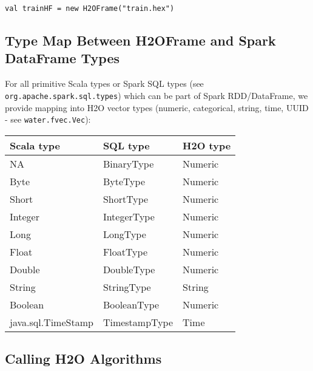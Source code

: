 \begin{lstlisting}[style=Scala]
val trainHF = new H2OFrame("train.hex")
\end{lstlisting}

\subsection{Type Map Between H2OFrame and Spark DataFrame Types}

For all primitive Scala types or Spark SQL types (see \linebreak \texttt{org.apache.spark.sql.types}) which can be part of Spark RDD/DataFrame, we provide mapping into H2O vector types (numeric, categorical, string, time, UUID - see \texttt{water.fvec.Vec}):

\begin{table}[!ht]
\centering
\begin{tabular}{l l l}
\toprule
Scala type  &	SQL type 	& H2O type \\
\midrule
NA & BinaryType & Numeric \\
Byte 	& ByteType & Numeric \\
Short & ShortType & Numeric \\
Integer & IntegerType & Numeric \\
Long & LongType & Numeric \\
Float & FloatType & Numeric \\
Double & DoubleType & Numeric \\
String & StringType & String \\
Boolean & BooleanType & Numeric \\
java.sql.TimeStamp & TimestampType & Time \\
\bottomrule
\end{tabular} 
\end{table}

\subsection{Calling H2O Algorithms}

